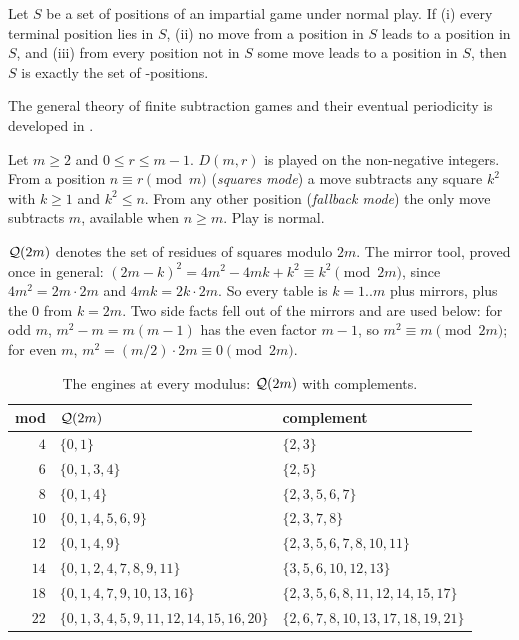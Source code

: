 \begin{lemma}
\label{lem:verify}
Let $S$ be a set of positions of an impartial game under normal play.
If (i) every terminal position lies in $S$, (ii) no move from a position
in $S$ leads to a position in $S$, and (iii) from every position not in
$S$ some move leads to a position in $S$, then $S$ is exactly the set of
\PP-positions.
\end{lemma}

The general theory of finite subtraction games and their eventual
periodicity is developed in \cite{siegel-thesis}.

\begin{definition}\label{def:game}
Let $m \ge 2$ and $0 \le r \le m-1$. $D(m,r)$ is played on the
non-negative integers. From a position $n \equiv r \pmod m$
(\emph{squares mode}) a move subtracts any square $k^2$ with $k \ge 1$
and $k^2 \le n$. From any other position (\emph{fallback mode}) the only
move subtracts $m$, available when $n \ge m$. Play is normal.
\end{definition}

\begin{definition}\label{def:Q}
$\mathcal{Q}(2m)$ denotes the set of residues of squares modulo $2m$.
The mirror tool, proved once in general: $(2m - k)^2 = 4m^2 - 4mk + k^2
\equiv k^2 \pmod{2m}$, since $4m^2 = 2m \cdot 2m$ and $4mk = 2k \cdot 2m$.
So every table is $k = 1..m$ plus mirrors, plus the $0$ from $k = 2m$.
Two side facts fell out of the mirrors and are used below: for odd $m$,
$m^2 - m = m(m - 1)$ has the even factor $m - 1$, so $m^2 \equiv m
\pmod{2m}$; for even $m$, $m^2 = (m/2) \cdot 2m \equiv 0 \pmod{2m}$.
\end{definition}

\begin{table}[htbp]
\centering
\begin{tabular}{r l l}
\hline
mod & $\mathcal{Q}(2m)$ & complement \\
\hline
$4$  & $\{0, 1\}$ & $\{2, 3\}$ \\
$6$  & $\{0, 1, 3, 4\}$ & $\{2, 5\}$ \\
$8$  & $\{0, 1, 4\}$ & $\{2, 3, 5, 6, 7\}$ \\
$10$ & $\{0, 1, 4, 5, 6, 9\}$ & $\{2, 3, 7, 8\}$ \\
$12$ & $\{0, 1, 4, 9\}$ & $\{2, 3, 5, 6, 7, 8, 10, 11\}$ \\
$14$ & $\{0, 1, 2, 4, 7, 8, 9, 11\}$ & $\{3, 5, 6, 10, 12, 13\}$ \\
$18$ & $\{0, 1, 4, 7, 9, 10, 13, 16\}$ & $\{2, 3, 5, 6, 8, 11, 12, 14, 15, 17\}$ \\
$22$ & $\{0, 1, 3, 4, 5, 9, 11, 12, 14, 15, 16, 20\}$ & $\{2, 6, 7, 8, 10, 13, 17, 18, 19, 21\}$ \\
\hline
\end{tabular}
\caption{The engines at every modulus: $\mathcal{Q}(2m)$ with complements.}
\label{tab:Q}
\end{table}

